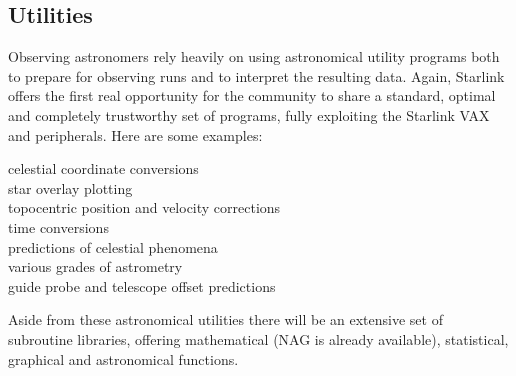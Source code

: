 \subsection {Utilities}
Observing astronomers rely heavily on using astronomical utility programs both
to prepare for observing runs and to interpret the resulting data.
Again, Starlink offers the first real opportunity for the community to share a
standard, optimal and completely trustworthy set of programs, fully exploiting
the Starlink VAX and peripherals.
Here are some examples:
\begin{description}
\item [celestial coordinate conversions]
\item [star overlay plotting]
\item [topocentric position and velocity corrections]
\item [time conversions]
\item [predictions of celestial phenomena]
\item [various grades of astrometry]
\item [guide probe and telescope offset predictions]
\end{description}
Aside from these astronomical utilities there will be an extensive set of
subroutine libraries, offering mathematical (NAG is already available),
statistical, graphical and astronomical functions.
